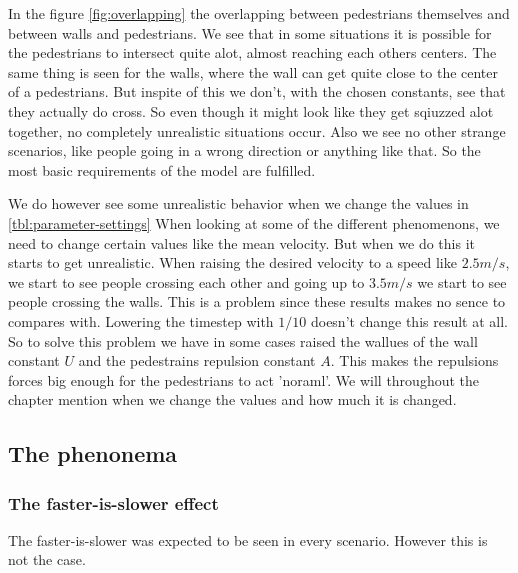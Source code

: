 In the figure \ref{fig:overlapping} the overlapping between pedestrians 
themselves and between walls and pedestrians. We see that in some situations 
it is possible for the pedestrians to intersect quite alot, almost reaching 
each others centers. The same thing is seen for the walls, where the wall 
can get quite close to the center of a pedestrians. But inspite of this 
we don't, with the chosen constants, see that they actually do cross. So 
even though it might look like they get sqiuzzed alot together, no completely 
unrealistic situations occur. Also we see no other strange scenarios, like 
people going in a wrong direction or anything like that. So the most basic 
requirements of the model are fulfilled. 

We do however see some unrealistic behavior when we change the values in 
\ref{tbl:parameter-settings} When looking at some of the different phenomenons, 
we need to change certain values like the mean velocity. But when we do 
this it starts to get unrealistic. When raising the desired velocity to 
a speed like $2.5m/s$, we start to see people crossing each other and going 
up to $3.5m/s$ we start to see people crossing the walls. This is a problem 
since these results makes no sence to compares with. Lowering the timestep 
with $1/10$ doesn't change this result at all. So to solve this problem we 
have in some cases raised the wallues of the wall constant $U$ and the 
pedestrains repulsion constant $A$. This makes the repulsions forces 
big enough for the pedestrians to act 'noraml'. We will throughout the 
chapter mention when we change the values and how much it is changed.

\subsection{The phenonema}

\subsubsection{The faster-is-slower effect}
The faster-is-slower was expected to be seen in every scenario.
However this is not the case.

